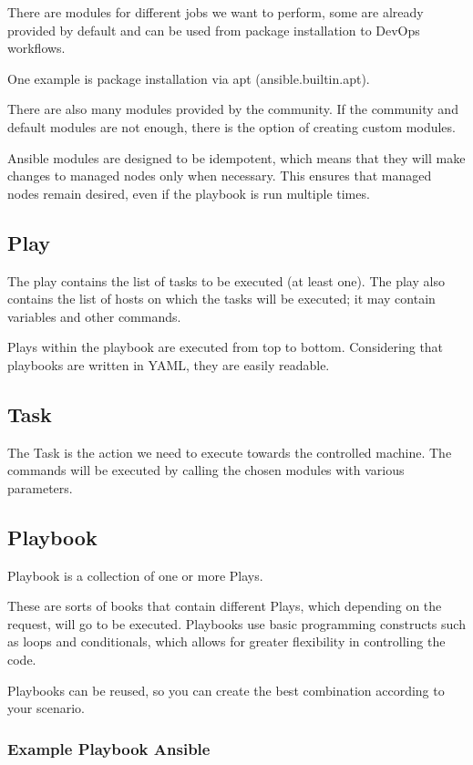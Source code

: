 \documentclass[12pt,a4paper,openright,twoside]{book}
\begin{document}
There are modules for different jobs we want to perform, some are already provided by default and can be used from package installation to DevOps workflows.


One example is package installation via apt (ansible.builtin.apt).


There are also many modules provided by the community. If the community and default modules are not enough, there is the option of creating custom modules\cite{ansibleDocNewModules}.


Ansible modules are designed to be idempotent, which means that they will make changes to managed nodes only when necessary. This ensures that managed nodes remain desired, even if the playbook is run multiple times.

\subsection{Play}
The play contains the list of tasks to be executed (at least one). The play also contains the list of hosts on which the tasks will be executed; it may contain variables and other commands.


Plays within the playbook are executed from top to bottom. Considering that playbooks are written in YAML, they are easily readable.

\subsection{Task}
The Task is the action we need to execute towards the controlled machine. The commands will be executed by calling the chosen modules with various parameters.

\subsection{Playbook}
Playbook is a collection of one or more Plays.


These are sorts of books that contain different Plays, which depending on the request, will go to be executed. Playbooks use basic programming constructs such as loops and conditionals, which allows for greater flexibility in controlling the code.


Playbooks can be reused, so you can create the best combination according to your scenario.

\subsubsection{Example Playbook Ansible}
\end{document}
